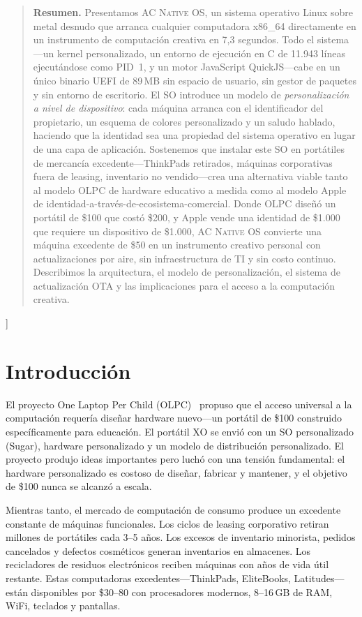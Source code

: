 \documentclass[10pt,letterpaper,twocolumn]{article}
\newcommand{\acos}{\textsc{AC Native OS}}
\begin{document}
{\begin{quote}
\small\noindent\textbf{Resumen.}
Presentamos \acos{}, un sistema operativo Linux sobre metal desnudo que arranca cualquier computadora x86\_64 directamente en un instrumento de computación creativa en 7,3 segundos. Todo el sistema---un kernel personalizado, un entorno de ejecución en C de 11.943 líneas ejecutándose como PID~1, y un motor JavaScript QuickJS---cabe en un único binario UEFI de 89\,MB sin espacio de usuario, sin gestor de paquetes y sin entorno de escritorio. El SO introduce un modelo de \emph{personalización a nivel de dispositivo}: cada máquina arranca con el identificador del propietario, un esquema de colores personalizado y un saludo hablado, haciendo que la identidad sea una propiedad del sistema operativo en lugar de una capa de aplicación. Sostenemos que instalar este SO en portátiles de mercancía excedente---ThinkPads retirados, máquinas corporativas fuera de leasing, inventario no vendido---crea una alternativa viable tanto al modelo OLPC de hardware educativo a medida como al modelo Apple de identidad-a-través-de-ecosistema-comercial. Donde OLPC diseñó un portátil de \$100 que costó \$200, y Apple vende una identidad de \$1.000 que requiere un dispositivo de \$1.000, \acos{} convierte una máquina excedente de \$50 en un instrumento creativo personal con actualizaciones por aire, sin infraestructura de TI y sin costo continuo. Describimos la arquitectura, el modelo de personalización, el sistema de actualización OTA y las implicaciones para el acceso a la computación creativa.
\end{quote}
\vspace{0.5em}
}]

\section{Introducción}

El proyecto One Laptop Per Child (OLPC)~\citep{negroponte1995being, kraemer2009olpc} propuso que el acceso universal a la computación requería diseñar hardware nuevo---un portátil de \$100 construido específicamente para educación. El portátil XO se envió con un SO personalizado (Sugar), hardware personalizado y un modelo de distribución personalizado. El proyecto produjo ideas importantes pero luchó con una tensión fundamental: el hardware personalizado es costoso de diseñar, fabricar y mantener, y el objetivo de \$100 nunca se alcanzó a escala.

Mientras tanto, el mercado de computación de consumo produce un excedente constante de máquinas funcionales. Los ciclos de leasing corporativo retiran millones de portátiles cada 3--5 años. Los excesos de inventario minorista, pedidos cancelados y defectos cosméticos generan inventarios en almacenes. Los recicladores de residuos electrónicos reciben máquinas con años de vida útil restante. Estas computadoras excedentes---ThinkPads, EliteBooks, Latitudes---están disponibles por \$30--80 con procesadores modernos, 8--16\,GB de RAM, WiFi, teclados y pantallas.
\end{document}
